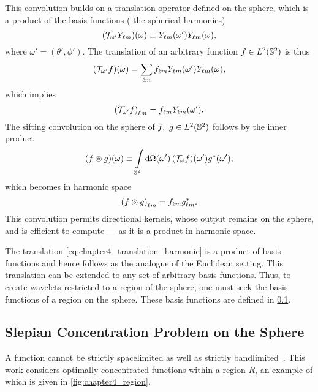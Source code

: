 This convolution builds on a translation operator defined on the sphere, which is a product of the basis functions (\ie{} the spherical harmonics)
%
\begin{equation}\label{eq:chapter4_translation_harmonic}
	\pixel{(\translation{\omega'}\harmonic{Y})}
	\equiv \pixel[']{\harmonic{Y}} \pixel{\harmonic{Y}},
\end{equation}
%
where \(\omega'=(\theta',\phi')\).
The translation of an arbitrary function \(f \in \hilbert{\twoSphere}\) is thus
%
\begin{equation}
	\pixel{(\translation{\omega'}f)}
	= \harmonicSum \harmonic{f} \pixel[']{\harmonic{Y}} \pixel{\harmonic{Y}},
\end{equation}
%
which implies
%
\begin{equation}
	\harmonic{(\translation{\omega'}f)} = \harmonic{f} \pixel[']{\harmonic{Y}}.
\end{equation}
%
The sifting convolution on the sphere of \(f,\ g \in \hilbert{\twoSphere}\) follows by the inner product
%
\begin{equation}\label{eq:chapter4_sifting_convolution}
	\pixel{\convolution{f}{g}}
	\equiv \integrateSphere{\omega'} \pixel[']{(\translation{\omega}f)} \pixel[']{\conj{g}},
\end{equation}
%
which becomes in harmonic space
%
\begin{equation}
	\harmonic{\convolution{f}{g}}
	= \harmonic{f} \conj{\harmonic{g}}.
\end{equation}
%
This convolution permits directional kernels, whose output remains on the sphere, and is efficient to compute --- as it is a product in harmonic space.

The translation \cref{eq:chapter4_translation_harmonic} is a product of basis functions and hence follows as the analogue of the Euclidean setting.
This translation can be extended to any set of arbitrary basis functions.
Thus, to create wavelets restricted to a region of the sphere, one must seek the basis functions of a region on the sphere.
These basis functions are defined in \cref{sec:chapter4_slepian_concentration_problem}.

\subsection{Slepian Concentration Problem on the Sphere}\label{sec:chapter4_slepian_concentration_problem}

A function cannot be strictly spacelimited as well as strictly bandlimited~\autocite{Slepian1961,Slepian1983}.
This work considers optimally concentrated functions within a region \(R\), an example of which is given in \cref{fig:chapter4_region}.

